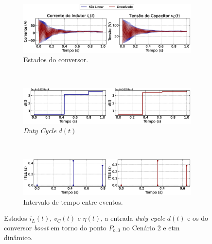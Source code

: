 \begin{figure}[H]
  \centering
  \captionsetup{justification=centering}
  \begin{subfigure}{1.\textwidth}
    \centering
    \includegraphics[width=1.\textwidth]{figuras/dynamic-etm/boost/sim2/op1/result.eps}
    \caption{Estados do conversor.}
    \label{fig:boost_converter_variable_pcpl_dynamic_etm_op1_a}
  \end{subfigure}
  \\[6pt]
  \begin{subfigure}{1.\textwidth}
    \centering
    \includegraphics[width=1.\textwidth]{figuras/dynamic-etm/boost/sim2/op1/duty-cycle.eps}
    \caption{\textit{Duty Cycle} $d(t)$}
    \label{fig:boost_converter_variable_pcpl_dynamic_etm_op1_b}
  \end{subfigure}
  \\[6pt]
  \begin{subfigure}{1.\textwidth}
    \centering
    \includegraphics[width=1.\textwidth]{figuras/dynamic-etm/boost/sim2/op1/inter-event-times.eps}
    \caption{Intervalo de tempo entre eventos.}
    \label{fig:boost_converter_variable_pcpl_dynamic_etm_op1_c}
  \end{subfigure}
  \caption{Estados $i_L(t)$, $v_C(t)$ e $\eta(t)$, a entrada \textit{duty cycle} $d(t)$ e os  do conversor \textit{boost }em torno do ponto $P_{\mathrm{o}, 3}$ no Cenário 2 e \acrshort{etm} dinâmico.}
  \label{fig:boost_converter_variable_pcpl_dynamic_etm_op1}
\end{figure}

